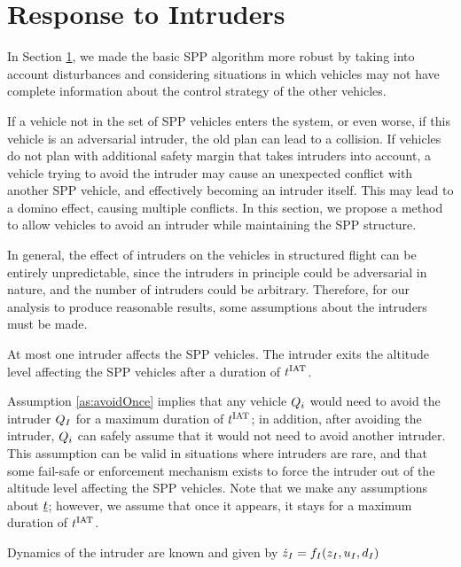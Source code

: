 \section{Response to Intruders \label{sec:intruder1}}
In Section \ref{}, we made the basic SPP algorithm more robust by taking into account disturbances and considering situations in which vehicles may not have complete information about the control strategy of the other vehicles. 

If a vehicle not in the set of SPP vehicles enters the system, or even worse, if this vehicle is an adversarial intruder, the old plan can lead to a collision. If vehicles do not plan with additional safety margin that takes intruders into account, a vehicle trying to avoid the intruder may cause an unexpected conflict with another SPP vehicle, and effectively becoming an intruder itself. This may lead to a domino effect, causing multiple conflicts. In this section, we propose a method to allow vehicles to avoid an intruder while maintaining the SPP structure.

In general, the effect of intruders on the vehicles in structured flight can be entirely unpredictable, since the intruders in principle could be adversarial in nature, and the number of intruders could be arbitrary. Therefore, for our analysis to produce reasonable results, some assumptions about the intruders must be made.

\begin{assumption}
\label{as:avoidOnce}
At most one intruder affects the SPP vehicles.  The intruder exits the altitude level affecting the SPP vehicles after a duration of $t^\text{IAT}$.
\end{assumption}

Assumption \ref{as:avoidOnce} implies that any vehicle $Q_{i}$ would need to avoid the intruder $Q_{I}$ for a maximum duration of $t^\text{IAT}$; in addition, after avoiding the intruder, $Q_{i}$ can safely assume that it would not need to avoid another intruder. This assumption can be valid in situations where intruders are rare, and that some fail-safe or enforcement mechanism exists to force the intruder out of the altitude level affecting the SPP vehicles. Note that we make any assumptions about $\underline{t}$; however, we assume that once it appears, it stays for a maximum duration of $t^\text{IAT}$.

\begin{assumption}
\label{as:dynKnown}
Dynamics of the intruder are known and given by $\dot{z}_I = f_I(z_I, u_I, d_I)$
\end{assumption}

